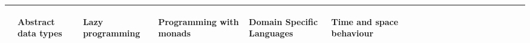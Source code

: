 \begin{table*}[h!]
\begin{minipage}[b]{0.5\linewidth}
{\begin{tabular}{llllllllllllllllllll}
\end{sideways} & \begin{sideways} Abstract data types \end{sideways} & \begin{sideways} Lazy programming \end{sideways} & \begin{sideways} Programming with monads \end{sideways} & \begin{sideways} Domain Specific Languages \end{sideways} & \begin{sideways} Time and space behaviour \end{sideways} \\ 
  \hline

  


\end{tabular}}
\end{minipage}
\end{table*}
